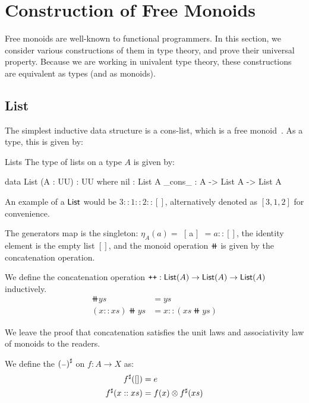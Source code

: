 \section{Construction of Free Monoids}
\label{sec:monoids}

Free monoids are well-known to functional programmers. In this section, we consider various constructions of them in type theory, and prove their universal property. Because we are working in univalent type theory, these constructions are equivalent as types (and as monoids).

\subsection{List}\label{mon:list}

The simplest inductive data structure is a cons-list, which is a free monoid~\cite{dubucFreeMonoids1974}. As a type, this is given by:

\begin{definition}{Lists}
The type of lists on a type $A$ is given by:
\begin{code}
data List (A : UU) : UU where
  nil : List A
  _cons_ : A -> List A -> List A
\end{code}
\end{definition}

An example of a $\operatorname{\mathsf{List}}$ would be $3 :: 1 :: 2 :: []$, alternatively denoted as $[3, 1, 2]$ for convenience.

The generators map is the singleton: $\eta_A(a) =$~[ a ]~$= a :: []$, 
the identity element is the empty list $[]$,
and the monoid operation $\doubleplus$ is given by the concatenation operation.

\begin{definition}[Concatenation]
We define the concatenation operation $\mathbin{\text{\ttfamily\upshape ++}} : \operatorname{\mathsf{List}}(A) \to \operatorname{\mathsf{List}}(A) \to \operatorname{\mathsf{List}}(A)$ inductively.
\begin{align*}
    [] \doubleplus ys & = ys \\
    (x :: xs) \doubleplus ys & = x :: (xs \doubleplus ys)
\end{align*}
\end{definition}

We leave the proof that concatenation satisfies the unit laws and associativity law of monoids to the readers.

\begin{definition}
We define the ${({\scriptstyle{-}})}^{\sharp}$ on $f : A \to X$ as:
\begin{align*}
    {f}^{\sharp}([]) & = e \\
    {f}^{\sharp}(x :: xs) & =  f(x) \otimes {f}^{\sharp}(xs)
\end{align*} 
\end{definition}

